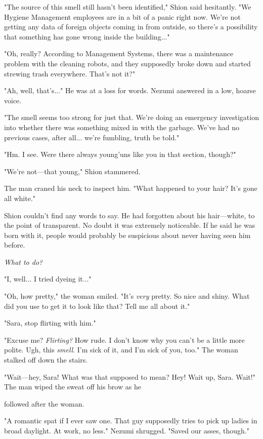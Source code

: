"The source of this smell still hasn't been identified," Shion said
hesitantly. "We Hygiene Management employees are in a bit of a panic
right now. We're not getting any data of foreign objects coming in from
outside, so there's a possibility that something has gone wrong inside
the building..."

"Oh, really? According to Management Systems, there was a maintenance
problem with the cleaning robots, and they supposedly broke down and
started strewing trash everywhere. That's not it?"

"Ah, well, that's..." He was at a loss for words. Nezumi answered in a
low, hoarse voice.

"The smell seems too strong for just that. We're doing an emergency
investigation into whether there was something mixed in with the
garbage. We've had no previous cases, after all... we're fumbling, truth
be told."

"Hm. I see. Were there always young'uns like you in that section,
though?"

"We're not---that young," Shion stammered.

The man craned his neck to inspect him. "What happened to your hair?
It's gone all white."

Shion couldn't find any words to say. He had forgotten about his
hair---white, to the point of transparent. No doubt it was extremely
noticeable. If he said he was born with it, people would probably be
suspicious about never having seen him before.

\emph{What to do?}

"I, well... I tried dyeing it..."

"Oh, how pretty," the woman smiled. "It's \emph{very} pretty. So nice and
shiny. What did you use to get it to look like that? Tell me all about
it."

"Sara, stop flirting with him."

"Excuse me? \emph{Flirting?} How rude. I don't know why you can't be a little
more polite. Ugh, this \emph{smell}. I'm sick of it, and I'm sick of you, too."
The woman stalked off down the stairs.

"Wait---hey, Sara! What was that supposed to mean? Hey! Wait up, Sara.
Wait!" The man wiped the sweat off his brow as he~

followed after the woman.

"A romantic spat if I ever saw one. That guy supposedly tries to pick up
ladies in broad daylight. At work, no less." Nezumi shrugged. "Saved our
asses, though."


